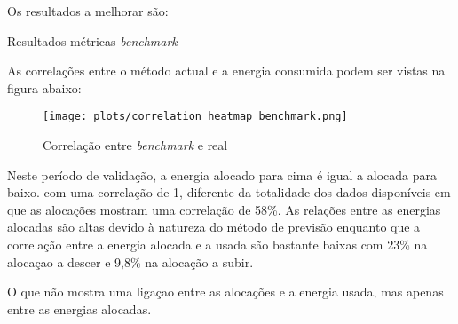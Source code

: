 Os resultados a melhorar são:\\
\begin{table}[H]
    \centering
    \caption{Resultados métricas \textit{benchmark}}    
    \resizebox{0.8\linewidth}{!}{}
    \label{tab:benchmarkmetrics}
    \end{table}

As correlações entre o método actual e a energia consumida podem ser vistas na figura abaixo:\\


\begin{figure}[H]
    \centering
    \texttt{[image: plots/correlation\_heatmap\_benchmark.png]}
    \caption{Correlação entre \textit{benchmark} e real}
    \label{fig:benchmarkcorr}
\end{figure}

Neste período de validação, a energia alocado para cima é igual a alocada para baixo. com uma correlação de 1, diferente da totalidade dos dados disponíveis em que as alocações mostram uma correlação de 58\%.
As relações entre as energias alocadas são altas devido à natureza do \hyperref[]{método de previsão} enquanto que a correlação entre a energia alocada e a usada são bastante baixas com 23\% na alocaçao a descer e 9,8\% na alocação a subir.\par
O que não mostra uma ligaçao entre as alocações e a energia usada, mas apenas entre as energias alocadas.\par

